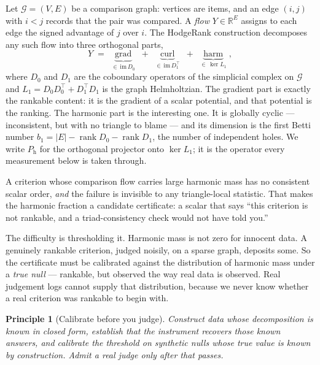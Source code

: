 \documentclass[11pt,a4paper]{article}
\newtheorem{principle}{Principle}
\newcommand{\grad}{\operatorname{grad}}
\newcommand{\curl}{\operatorname{curl}}
\newcommand{\harm}{\operatorname{harm}}
\newcommand{\rank}{\operatorname{rank}}
\newcommand{\Ph}{P_{\mathrm{h}}}
\begin{document}
Let $\mathcal{G}=(V,E)$ be a comparison graph: vertices are items, and an edge
$(i,j)$ with $i<j$ records that the pair was compared. A \emph{flow}
$Y\in\mathbb{R}^{E}$ assigns to each edge the signed advantage of $j$ over $i$.
The HodgeRank construction \cite{jiang2011} decomposes any such flow into three
orthogonal parts,
\begin{equation}
Y \;=\; \underbrace{\grad}_{\in\,\mathrm{im}\,D_0}
      \;+\; \underbrace{\curl}_{\in\,\mathrm{im}\,D_1^{\top}}
      \;+\; \underbrace{\harm}_{\in\,\ker L_1},
\label{eq:hodge}
\end{equation}
where $D_0$ and $D_1$ are the coboundary operators of the simplicial complex on
$\mathcal{G}$ and $L_1 = D_0D_0^{\top} + D_1^{\top}D_1$ is the graph
Helmholtzian. The gradient part is exactly the rankable content: it is the
gradient of a scalar potential, and that potential is the ranking. The harmonic
part is the interesting one. It is globally cyclic --- inconsistent, but with no
triangle to blame --- and its dimension is the first Betti number
$b_1 = |E| - \rank D_0 - \rank D_1$, the number of independent holes. We write
$\Ph$ for the orthogonal projector onto $\ker L_1$; it is the operator every
measurement below is taken through.

A criterion whose comparison flow carries large harmonic mass has no consistent
scalar order, \emph{and} the failure is invisible to any triangle-local
statistic. That makes the harmonic fraction a candidate certificate: a scalar
that says ``this criterion is not rankable, and a triad-consistency check would
not have told you.''

The difficulty is thresholding it. Harmonic mass is not zero for innocent data.
A genuinely rankable criterion, judged noisily, on a sparse graph, deposits some.
So the certificate must be calibrated against the distribution of harmonic mass
under a \emph{true null} --- rankable, but observed the way real data is
observed. Real judgement logs cannot supply that distribution, because we never
know whether a real criterion was rankable to begin with.

\begin{principle}[Calibrate before you judge]
Construct data whose decomposition is known in closed form, establish that the
instrument recovers those known answers, and calibrate the threshold on
synthetic nulls whose true value is known by construction. Admit a real judge
only after that passes.
\end{principle}
\end{document}
